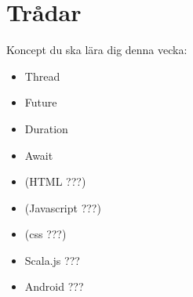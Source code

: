 \chapter{Trådar}\label{chapter:W12}
Koncept du ska lära dig denna vecka:
\begin{multicols}{2}\begin{itemize}[nosep,label={$\square$},leftmargin=*]
\item Thread
\item Future
\item Duration
\item Await
\item (HTML ???)
\item (Javascript ???)
\item (css ???)
\item Scala.js ???
\item Android ???\end{itemize}\end{multicols}
